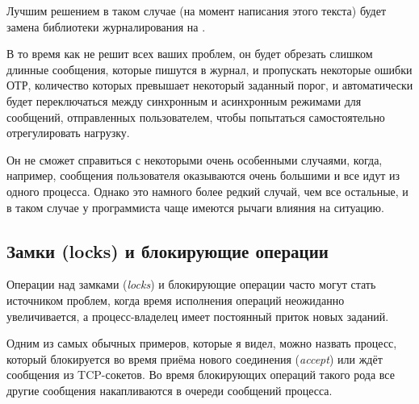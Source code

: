 \documentclass[11pt, oneside]{book}   	%
\begin{document}
Лучшим решением в таком случае (на момент написания этого текста) будет замена библиотеки журналирования на \href{https://github.com/basho/lager}{}.

В то время как  не решит всех ваших проблем, он будет обрезать слишком длинные сообщения, которые пишутся в журнал, и пропускать некоторые ошибки ОТР, количество которых превышает некоторый заданный порог, и автоматически будет переключаться между синхронным и асинхронным режимами для сообщений, отправленных пользователем, чтобы попытаться самостоятельно отрегулировать нагрузку.

Он не сможет справиться с некоторыми очень особенными случаями, когда, например, сообщения пользователя оказываются очень большими и все идут из одного процесса. Однако это намного более редкий случай, чем все остальные, и в таком случае у программиста чаще имеются рычаги влияния на ситуацию.


\subsection{Замки (locks) и блокирующие операции}

Операции над замками (\emph{locks}) и блокирующие операции часто могут стать источником проблем, когда время исполнения операций неожиданно увеличивается, а процесс-владелец имеет постоянный приток новых заданий.

Одним из самых обычных примеров, которые я видел, можно назвать процесс, который блокируется во время приёма нового соединения (\emph{accept}) или ждёт сообщения из TCP-сокетов. Во время блокирующих операций такого рода все другие сообщения накапливаются в очереди сообщений процесса.
\end{document}
